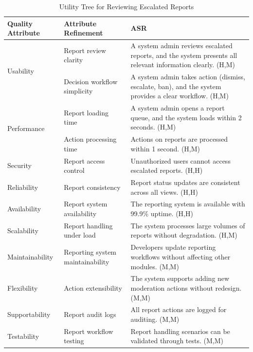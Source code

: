 \documentclass{article}
\begin{document}
\begin{table}[H]
\centering
\caption{Utility Tree for Reviewing Escalated Reports}
\begin{tabular}{|p{3cm}|p{4cm}|p{7cm}|}
\hline
\textbf{Quality Attribute} & \textbf{Attribute Refinement} & \textbf{ASR} \\
\hline

\multirow{2}{*}{Usability}
& Report review clarity
& A system admin reviews escalated reports, and the system presents all relevant information clearly. (H,M) \\
\cline{2-3}
& Decision workflow simplicity
& A system admin takes action (dismiss, escalate, ban), and the system provides a clear workflow. (H,M) \\
\hline

\multirow{2}{*}{Performance}
& Report loading time
& A system admin opens a report queue, and the system loads within 2 seconds. (H,M) \\
\cline{2-3}
& Action processing time
& Actions on reports are processed within 1 second. (H,M) \\
\hline

Security
& Report access control
& Unauthorized users cannot access escalated reports. (H,H) \\
\hline

Reliability
& Report consistency
& Report status updates are consistent across all views. (H,H) \\
\hline

Availability
& Report system availability
& The reporting system is available with 99.9\% uptime. (H,H) \\
\hline

Scalability
& Report handling under load
& The system processes large volumes of reports without degradation. (H,M) \\
\hline

Maintainability
& Reporting system maintainability
& Developers update reporting workflows without affecting other modules. (M,M) \\
\hline

Flexibility
& Action extensibility
& The system supports adding new moderation actions without redesign. (M,M) \\
\hline

Supportability
& Report audit logs
& All report actions are logged for auditing. (M,M) \\
\hline

Testability
& Report workflow testing
& Report handling scenarios can be validated through tests. (M,M) \\
\hline

\end{tabular}
\end{table}
\end{document}
